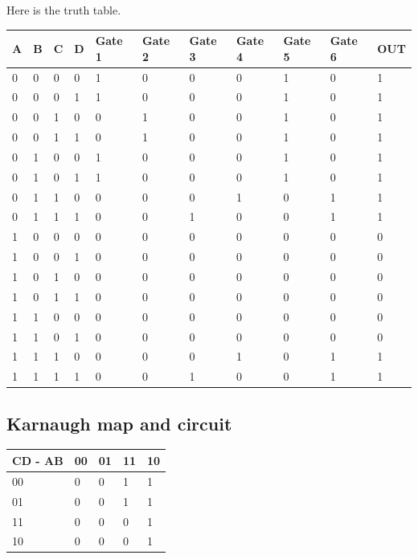 \documentclass[12pt]{article}
\begin{document}
Here is the truth table.
\begin{table}[h]
\begin{tabular}{|l|l|l|l|l|l|l|l|l|l|l|}
\hline
A & B & C & D & Gate 1 & Gate 2 & Gate 3 & Gate 4 & Gate 5 & Gate 6 & OUT \\ \hline
0 & 0 & 0 & 0 & 1 & 0 & 0 & 0 & 1 & 0 & 1 \\ \hline
0 & 0 & 0 & 1 & 1 & 0 & 0 & 0 & 1 & 0 & 1 \\ \hline
0 & 0 & 1 & 0 & 0 & 1 & 0 & 0 & 1 & 0 & 1 \\ \hline
0 & 0 & 1 & 1 & 0 & 1 & 0 & 0 & 1 & 0 & 1 \\ \hline
0 & 1 & 0 & 0 & 1 & 0 & 0 & 0 & 1 & 0 & 1 \\ \hline
0 & 1 & 0 & 1 & 1 & 0 & 0 & 0 & 1 & 0 & 1 \\ \hline
0 & 1 & 1 & 0 & 0 & 0 & 0 & 1 & 0 & 1 & 1 \\ \hline
0 & 1 & 1 & 1 & 0 & 0 & 1 & 0 & 0 & 1 & 1 \\ \hline
1 & 0 & 0 & 0 & 0 & 0 & 0 & 0 & 0 & 0 & 0 \\ \hline
1 & 0 & 0 & 1 & 0 & 0 & 0 & 0 & 0 & 0 & 0 \\ \hline
1 & 0 & 1 & 0 & 0 & 0 & 0 & 0 & 0 & 0 & 0 \\ \hline
1 & 0 & 1 & 1 & 0 & 0 & 0 & 0 & 0 & 0 & 0 \\ \hline
1 & 1 & 0 & 0 & 0 & 0 & 0 & 0 & 0 & 0 & 0 \\ \hline
1 & 1 & 0 & 1 & 0 & 0 & 0 & 0 & 0 & 0 & 0 \\ \hline
1 & 1 & 1 & 0 & 0 & 0 & 0 & 1 & 0 & 1 & 1 \\ \hline
1 & 1 & 1 & 1 & 0 & 0 & 1 & 0 & 0 & 1 & 1 \\ \hline
\end{tabular}
\end{table}

\subsection{Karnaugh map and circuit}

\begin{table}[h]
\begin{tabular}{@{}lllll@{}}
\toprule
CD - AB & 00 & 01 & 11 & 10 \\ \midrule
00      & 0  & 0  & 1  & 1  \\
01      & 0  & 0  & 1  & 1  \\
11      & 0  & 0  & 0  & 1  \\
10      & 0  & 0  & 0  & 1  \\ \bottomrule
\end{tabular}
\end{table}
\end{document}
